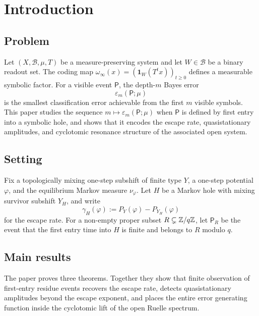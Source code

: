 \section{Introduction}\label{sec:introduction}

\subsection*{Problem}

Let \((X,\mathcal{B},\mu,T)\) be a measure-preserving system and let
\(W\in\mathcal{B}\) be a binary readout set.  The coding map
\(\omega_\infty(x)=(\mathbf{1}_W(T^t x))_{t\geq 0}\) defines a
measurable symbolic factor.  For a visible event \(\mathsf P\), the
depth-\(m\) Bayes error
\[
  \varepsilon_m(\mathsf P;\mu)
\]
is the smallest classification error achievable from the first \(m\)
visible symbols.  This paper studies the sequence
\(m\mapsto \varepsilon_m(\mathsf P;\mu)\) when \(\mathsf P\) is defined
by first entry into a symbolic hole, and shows that it encodes the
escape rate, quasistationary amplitudes, and cyclotomic resonance
structure of the associated open system.

\subsection*{Setting}

Fix a topologically mixing one-step subshift of finite type \(Y\), a
one-step potential \(\varphi\), and the equilibrium Markov measure
\(\nu_\varphi\).  Let \(H\) be a Markov hole with mixing survivor
subshift \(Y_H\), and write
\[
  \gamma_H(\varphi):=P_Y(\varphi)-P_{Y_H}(\varphi)
\]
for the escape rate.  For a non-empty proper subset
\(R\subsetneq \mathbb{Z}/q\mathbb{Z}\), let \(\mathsf P_R\) be the event that the
first entry time into \(H\) is finite and belongs to \(R\) modulo
\(q\).

\subsection*{Main results}

The paper proves three theorems.  Together they show that
finite observation of first-entry residue events recovers the escape
rate, detects quasistationary amplitudes beyond the escape exponent, and
places the entire error generating function inside the cyclotomic lift of
the open Ruelle spectrum.

